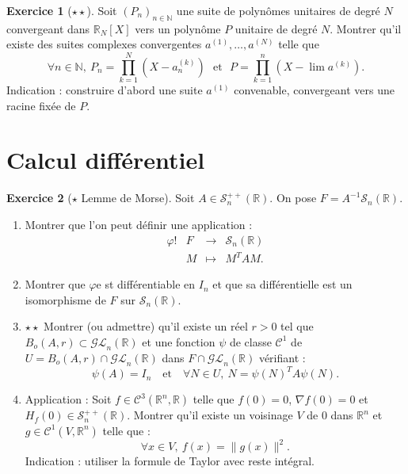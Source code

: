 \documentclass[french]{article}
\newcommand{\N}{\mathbb{N}}
\newcommand{\R}{\mathbb{R}}
\newcommand{\inv}{^{-1}}
\theoremstyle{definition}
\newtheorem{exo}{Exercice}
\begin{document}
\begin{exo}[$\star\star$]
	Soit $(P_n)_{n\in\N}$ une suite de polynômes unitaires de degré $N$ convergeant dans $\R_N[X]$ vers un polynôme $P$ unitaire de degré $N$. Montrer qu'il existe des suites complexes convergentes $a^{(1)},\ldots,a^{(N)}$ telle que $$\forall n\in\N,\ P_n=\prod_{k=1}^{N}(X-a_n^{(k)}) \ \ \ \text{et} \ \ \ P=\prod_{k=1}^{n}(X-\lim a^{(k)}).$$ Indication : construire d'abord une suite $a^{(1)}$ convenable, convergeant vers une racine fixée de $P$.
\end{exo}

\section*{Calcul différentiel}

\begin{exo}[$\star$ Lemme de Morse]
	Soit $A\in\mathcal{S}_n^{++}(\R)$. On pose $F=A\inv\mathcal{S}_n(\R)$.
	\begin{enumerate}
		\item Montrer que l'on peut définir une application :
		$$\begin{array}{lrcl}
			\varphi!&F&\longrightarrow&\mathcal{S}_n(\R)\\
			&M&\longmapsto&M^TAM.
		\end{array}$$
		\item Montrer que $\varphi$e st différentiable en $I_n$ et que sa différentielle est un isomorphisme de $F$ sur $\mathcal{S}_n(\R)$.
		\item $\star\star$ Montrer (ou admettre) qu'il existe un réel $r>0$ tel que $B_o(A,r)\subset\mathcal{GL}_n(\R)$ et une fonction $\psi$ de classe $\mathcal{C}^1$ de $U=B_o(A,r)\cap\mathcal{GL}_n(\R)$ dans $F\cap\mathcal{GL}_n(\R)$ vérifiant :
		$$\psi(A)=I_n\quad\text{et}\quad\forall N\in U,\ N=\psi(N)^TA\psi(N).$$
		\item Application : Soit $f\in\mathcal{C}^3(\R^n,\R)$ telle que $f(0)=0$, $\nabla f(0)=0$ et $H_f(0)\in\mathcal{S}_n^{++}(\R)$. Montrer qu'il existe un voisinage $V$ de $0$ dans $\R^n$ et $g\in\mathcal{C}^1(V,\R^n)$ telle que :
		$$\forall x\in V,\ f(x)=\lVert g(x)\rVert^2.$$
		Indication : utiliser la formule de Taylor avec reste intégral.
	\end{enumerate}
\end{exo}
\end{document}
